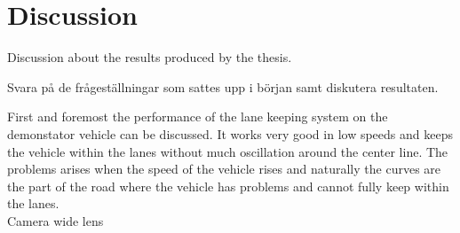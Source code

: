 \chapter{Discussion}
Discussion about the results produced by the thesis.

Svara på de frågeställningar som sattes upp i början samt diskutera resultaten.

First and foremost the performance of the lane keeping system on the demonstator vehicle can be discussed. It works very good in low speeds and keeps the vehicle within the lanes without much oscillation around the center line. The problems arises when the speed of the vehicle rises and naturally the curves are the part of the road where the vehicle has problems and cannot fully keep within the lanes.\\

Camera wide lens\\



